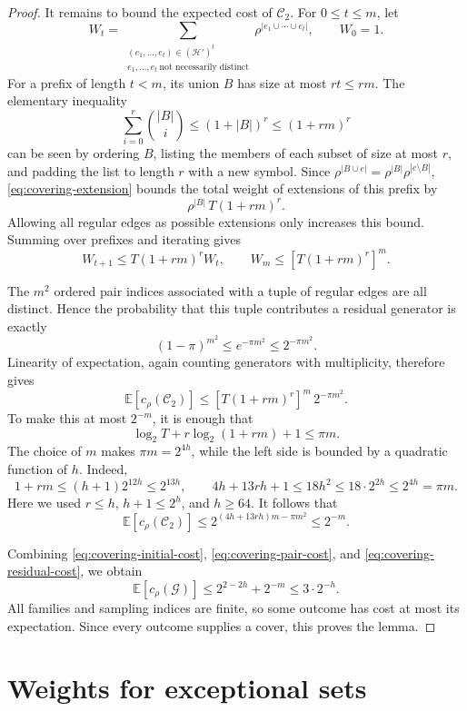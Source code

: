 \documentclass[11pt,letterpaper]{article}
\theoremstyle{definition}
\theoremstyle{remark}
\numberwithin{equation}{section}
\begin{document}
\begin{proof}
It remains to bound the expected cost of \(\mathcal C_2\). For
\(0\le t\le m\), let
\[
W_t=
\sum_{\substack{(e_1,\ldots,e_t)\in(\mathcal H')^t\\
                e_1,\ldots,e_t\ \text{not necessarily distinct}}}
  \rho^{|e_1\cup\cdots\cup e_t|},
\qquad W_0=1.
\]
For a prefix of length \(t<m\), its union \(B\) has size at most \(rt\le rm\).
The elementary inequality
\[
\sum_{i=0}^r\binom{|B|}{i}\le(1+|B|)^r\le(1+rm)^r
\]
can be seen by ordering \(B\), listing the members of each subset of size
at most \(r\), and padding the list to length \(r\) with a new symbol.
Since
\(\rho^{|B\cup e|}=\rho^{|B|}\rho^{|e\setminus B|}\),
\eqref{eq:covering-extension} bounds the total weight of extensions of
this prefix by
\[
\rho^{|B|}\,T(1+rm)^r.
\]
Allowing all regular edges as possible extensions only increases this
bound. Summing over prefixes and iterating gives
\[
W_{t+1}\le T(1+rm)^rW_t,
\qquad
W_m\le[T(1+rm)^r]^m.
\]

The \(m^2\) ordered pair indices associated with a tuple of regular
edges are all distinct. Hence the probability that this tuple contributes
a residual generator is exactly
\[
(1-\pi)^{m^2}\le e^{-\pi m^2}\le2^{-\pi m^2}.
\]
Linearity of expectation, again counting generators with multiplicity,
therefore gives
\[
\mathbb E[c_\rho(\mathcal C_2)]
\le[T(1+rm)^r]^m\,2^{-\pi m^2}.
\]
To make this at most \(2^{-m}\), it is enough that
\[
\log_2 T+r\log_2(1+rm)+1\le\pi m.
\]
The choice of \(m\) makes \(\pi m=2^{4h}\), while the left side
is bounded by a quadratic function of \(h\). Indeed,
\[
1+rm\le(h+1)2^{12h}\le2^{13h},
\qquad
4h+13rh+1\le18h^2
\le18\cdot2^{2h}\le2^{4h}=\pi m.
\]
Here we used \(r\le h\), \(h+1\le2^h\), and \(h\ge64\).
It follows that
\begin{equation}\label{eq:covering-residual-cost}
\mathbb E[c_\rho(\mathcal C_2)]
\le2^{(4h+13rh)m-\pi m^2}\le2^{-m}.
\end{equation}

Combining \eqref{eq:covering-initial-cost},
\eqref{eq:covering-pair-cost}, and
\eqref{eq:covering-residual-cost}, we obtain
\[
\mathbb E[c_\rho(\mathcal G)]
\le2^{2-2h}+2^{-m}\le3\cdot2^{-h}.
\]
All families and sampling indices are finite, so some outcome has cost
at most its expectation. Since every outcome supplies a cover, this proves
the lemma.
\end{proof}

\section{Weights for exceptional sets}
\label{sec:weights}
\end{document}
